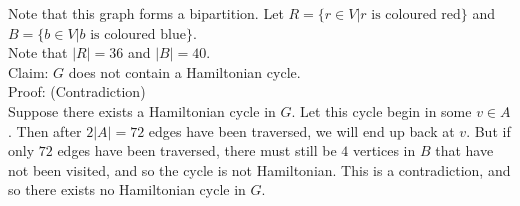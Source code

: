 \documentclass{article}
\begin{document}
	\newline
	\newline
	Note that this graph forms a bipartition. Let $R=\{r\in{V}|\text{$r$ is coloured red}\}$ and $B=\{b\in{V}|\text{$b$ is coloured blue}\}$.\\
	Note that $|R|=36$ and $|B|=40$.\\
	Claim: $G$ does not contain a Hamiltonian cycle.\\
	Proof: (Contradiction)\\
	Suppose there exists a Hamiltonian cycle in $G$. Let this cycle begin in some $v\in{A}$. Then after $2|A|=72$ edges have been traversed,
	we will end up back at $v$. But if only $72$ edges have been traversed, there must still be $4$ vertices in $B$ that have not been visited,
	and so the cycle is not Hamiltonian. This is a contradiction, and so there exists no Hamiltonian cycle in $G$.
\end{document}
